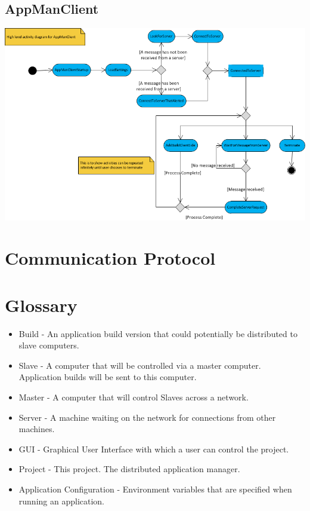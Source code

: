\documentclass[a4paper,12pt,final]{article}
\begin{document}
\subsection{AppManClient}
\begin{center}
\includegraphics[angle = 90, scale=1]{SlaveMainActivity.png}
\end{center}



\newpage
\section{Communication Protocol}





\newpage
\section{Glossary}
\begin{itemize}
\item{Build - An application build version that could potentially be distributed to slave computers.}
\item{Slave - A computer that will be controlled via a master computer. Application builds will be sent to this computer.}
\item{Master - A computer that will control Slaves across a network.}
\item{Server - A machine waiting on the network for connections from other machines.}
\item{GUI - Graphical User Interface with which a user can control the project.}
\item{Project - This project. The distributed application manager.}
\item{Application Configuration - Environment variables that are specified when running an application.}
\end{itemize}
\end{document}
